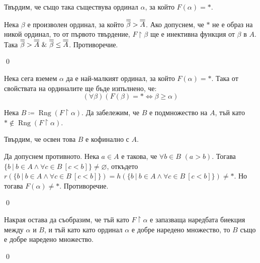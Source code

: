 \quad
Твърдим, че също така съществува ординал $\alpha$, за който $F(\alpha) = *$.
\begin{tcolorbox}[mybox={Доказателство:}]
\quad
Нека $\beta$ е произволен ординал, за който $\overline{\overline{\beta}} > \overline{\overline{A}}$.
Ако допуснем, че $*$ не е образ на никой ординал, то
от първото твърдение, $F \restriction \beta$ ще е инективна функция от $\beta$ в $A$.
Така $\overline{\overline{\beta}} > \overline{\overline{A}} \ \&\  \overline{\overline{\beta}} \leq \overline{\overline{A}}$. Противоречие.

\qed
\end{tcolorbox}

\quad
Нека сега вземем $\alpha$ да е най-малкият ординал, за който $F(\alpha) = *$.
Така от свойствата на ординалите ще бъде изпълнено, че:
\[
(\forall \beta)(F(\beta) = * \iff \beta \ge \alpha)
\]

\quad
Нека $B \coloneq \operatorname{Rng}(F \restriction \alpha)$.
Да забележим, че $B$ е подмножество на $A$, тъй като $* \notin \operatorname{Rng}(F \restriction \alpha)$.

\quad
Твърдим, че освен това $B$ е кофинално с $A$.
\begin{tcolorbox}[mybox={Доказателство:}]
\quad
Да допуснем противното.
Нека $a \in A$ е такова, че $\forall b \in B$ $(a > b)$.
Тогава $\{b\ |\ b \in A \land \forall c \in B \ [c < b] \} \neq \varnothing$,
откъдето $r(\{b\ |\ b \in A \land \forall c \in B \ [c < b] \}) = h(\{b\ |\ b \in A \land \forall c \in B \ [c < b] \}) \neq *$.
Но тогава $F(\alpha) \neq *$. Противоречие.

\qed
\end{tcolorbox}

\quad
Накрая остава да съобразим, че тъй като $F \restriction \alpha$ е запазваща наредбата биекция между $\alpha$ и $B$,
и тъй като като ординал $\alpha$ е добре наредено множество, то $B$ също е добре наредено множество.

\qed
